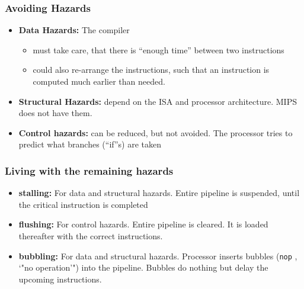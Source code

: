 \documentclass[fs, footer]{latex4ei}
\begin{document}
\begin{multicols*}{4}
{\subsubsection{Avoiding Hazards}
\begin{itemize}
\item \textbf{Data Hazards:} The compiler
\begin{itemize}
\item must take care, that there is "`enough time"' between two instructions
\item could also re-arrange the instructions, such that an instruction is computed much earlier than needed.
\end{itemize}
\item \textbf{Structural Hazards:} depend on the ISA and processor architecture. MIPS does not have them.
\item \textbf{Control hazards:} can be reduced, but not avoided. The processor tries to predict what branches ("`if"'s) are taken
\end{itemize}

\subsubsection{Living with the remaining hazards}
\begin{itemize}
\item \textbf{stalling:} For data and structural hazards. Entire pipeline is suspended, until the critical instruction is completed
\item \textbf{flushing:} For control hazards. Entire pipeline is cleared. It is loaded thereafter with the correct instructions.
\item \textbf{bubbling:} For data and structural hazards. Processor inserts bubbles (\texttt{nop} , `"no operation'") into the pipeline. Bubbles do nothing but delay the upcoming instructions.
\end{itemize}
}
\sectionbox{
}
\end{multicols*}
\end{document}
